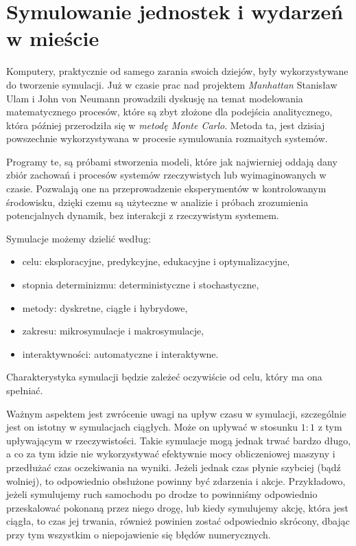 \section{Symulowanie jednostek i wydarzeń w mieście}

\par Komputery, praktycznie od samego zarania swoich dziejów, były wykorzystywane do tworzenie symulacji. Już w czasie prac nad projektem \emph{Manhattan} Stanisław Ulam i John von Neumann prowadzili dyskusję na temat modelowania matematycznego procesów, które są zbyt złożone dla podejścia analitycznego, która później przerodziła się w \emph{metodę Monte Carlo}\cite{WIKIPEDIA_METODA_MONTE_CARLO}. Metoda ta, jest dzisiaj powszechnie wykorzystywana w procesie symulowania rozmaitych systemów.

\par Programy te, są próbami stworzenia modeli, które jak najwierniej oddają dany zbiór zachowań i procesów systemów rzeczywistych lub wyimaginowanych w czasie. Pozwalają one na przeprowadzenie eksperymentów w kontrolowanym środowisku, dzięki czemu są użyteczne w analizie i próbach zrozumienia potencjalnych dynamik, bez interakcji z rzeczywistym systemem.

\par Symulacje możemy dzielić według:
\begin{itemize}
    \item celu: eksploracyjne, predykcyjne, edukacyjne i optymalizacyjne,
    \item stopnia determinizmu: deterministyczne i stochastyczne,
    \item metody: dyskretne, ciągłe i hybrydowe,
    \item zakresu: mikrosymulacje i makrosymulacje,
    \item interaktywności: automatyczne i interaktywne.
\end{itemize}
Charakterystyka symulacji będzie zależeć oczywiście od celu, który ma ona spełniać.

\par Ważnym aspektem jest zwrócenie uwagi na upływ czasu w symulacji, szczególnie jest on istotny w symulacjach ciągłych. Może on upływać w stosunku $1:1$ z tym upływającym w rzeczywistości. Takie symulacje mogą jednak trwać bardzo długo, a co za tym idzie nie wykorzystywać efektywnie mocy obliczeniowej maszyny i przedłużać czas oczekiwania na wyniki. Jeżeli jednak czas płynie szybciej (bądź wolniej), to odpowiednio obsłużone powinny być zdarzenia i akcje. Przykładowo, jeżeli symulujemy ruch samochodu po drodze to powinniśmy odpowiednio przeskalować pokonaną przez niego drogę, lub kiedy symulujemy akcję, która jest ciągła, to czas jej trwania, również powinien zostać odpowiednio skrócony, dbając przy tym wszystkim o niepojawienie się błędów numerycznych.


